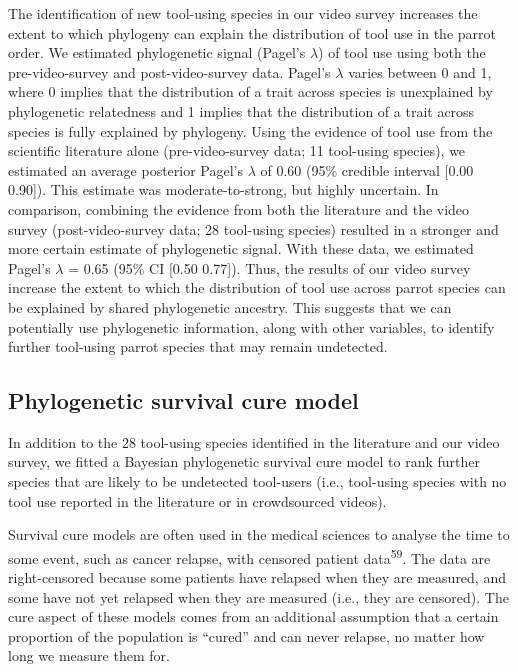 \documentclass[
  man,floatsintext]{apa6}
\begin{document}
The identification of new tool-using species in our video survey increases the extent to which phylogeny can explain the distribution of tool use in the parrot order. We estimated phylogenetic signal (Pagel's \(\lambda\)) of tool use using both the pre-video-survey and post-video-survey data. Pagel's \(\lambda\) varies between 0 and 1, where 0 implies that the distribution of a trait across species is unexplained by phylogenetic relatedness and 1 implies that the distribution of a trait across species is fully explained by phylogeny. Using the evidence of tool use from the scientific literature alone (pre-video-survey data; 11 tool-using species), we estimated an average posterior Pagel's \(\lambda\) of 0.60 (95\% credible interval {[}0.00 0.90{]}). This estimate was moderate-to-strong, but highly uncertain. In comparison, combining the evidence from both the literature and the video survey (post-video-survey data; 28 tool-using species) resulted in a stronger and more certain estimate of phylogenetic signal. With these data, we estimated Pagel's \(\lambda\) = 0.65 (95\% CI {[}0.50 0.77{]}). Thus, the results of our video survey increase the extent to which the distribution of tool use across parrot species can be explained by shared phylogenetic ancestry. This suggests that we can potentially use phylogenetic information, along with other variables, to identify further tool-using parrot species that may remain undetected.

\hypertarget{phylogenetic-survival-cure-model}{%
\subsection{Phylogenetic survival cure model}\label{phylogenetic-survival-cure-model}}

In addition to the 28 tool-using species identified in the literature and our video survey, we fitted a Bayesian phylogenetic survival cure model to rank further species that are likely to be undetected tool-users (i.e., tool-using species with no tool use reported in the literature or in crowdsourced videos).

Survival cure models are often used in the medical sciences to analyse the time to some event, such as cancer relapse, with censored patient data\textsuperscript{59}. The data are right-censored because some patients have relapsed when they are measured, and some have not yet relapsed when they are measured (i.e., they are censored). The cure aspect of these models comes from an additional assumption that a certain proportion of the population is ``cured'' and can never relapse, no matter how long we measure them for.
\end{document}
